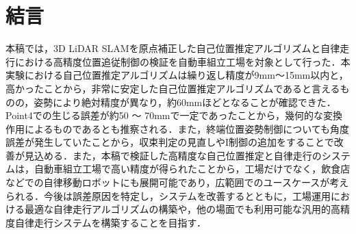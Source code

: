 \section{結言}
本稿では，3D LiDAR SLAMを原点補正した自己位置推定アルゴリズムと自律走行における高精度位置追従制御の検証を自動車組立工場を対象として行った．本実験における自己位置推定アルゴリズムは繰り返し精度が9mm〜15mm以内と，高かったことから，非常に安定した自己位置推定アルゴリズムであると言えるものの，姿勢により絶対精度が異なり，約60mmほどとなることが確認できた．Point4での生じる誤差が約50 〜 70mmで一定であったことから，幾何的な変換作用によるものであるとも推察される．また，終端位置姿勢制御についても角度誤差が発生していたことから，収束判定の見直しやI制御の追加をすることで改善が見込める．また，本稿で検証した高精度な自己位置推定と自律走行のシステムは，自動車組立工場で高い精度が得られたことから，工場だけでなく，飲食店などでの自律移動ロボットにも展開可能であり，広範囲でのユースケースが考えられる．今後は誤差原因を特定し，システムを改善するとともに，工場運用における最適な自律走行アルゴリズムの構築や，他の場面でも利用可能な汎用的高精度自律走行システムを構築することを目指す．
